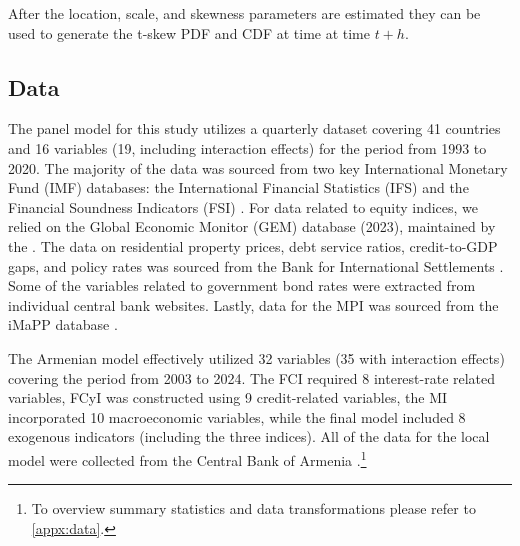 After the location, scale, and skewness parameters are estimated they can be used to generate the t-skew PDF and CDF at time at time $t+h$.

\subsection{Data}
The panel model for this study utilizes a quarterly dataset covering 41 countries and 16 variables (19, including interaction effects) for the period from 1993 to 2020. The majority of the data was sourced from two key International Monetary Fund (IMF) databases: the International Financial Statistics (IFS) and the Financial Soundness Indicators (FSI) \citep{ifs2024, fsi2024}. For data related to equity indices, we relied on the Global Economic Monitor (GEM) database (2023), maintained by the \citet{gem2024}. The data on residential property prices, debt service ratios, credit-to-GDP gaps, and policy rates was sourced from the Bank for International Settlements \citep{RPP, DSR, CREDIT_GAPS, CBPOL}. Some of the variables related to government bond rates were extracted from individual central bank websites. Lastly, data for the MPI was sourced from the iMaPP database \citep{alam2019}.

The Armenian model effectively utilized 32 variables (35 with interaction effects) covering the period from 2003 to 2024. The FCI required 8 interest-rate related variables, FCyI was constructed using 9 credit-related variables, the MI incorporated 10 macroeconomic variables, while the final model included 8 exogenous indicators (including the three indices). All of the data for the local model were collected from the Central Bank of Armenia \citep{cba2024}.\footnote{To overview summary statistics and data transformations please refer to \ref{appx:data}.}

